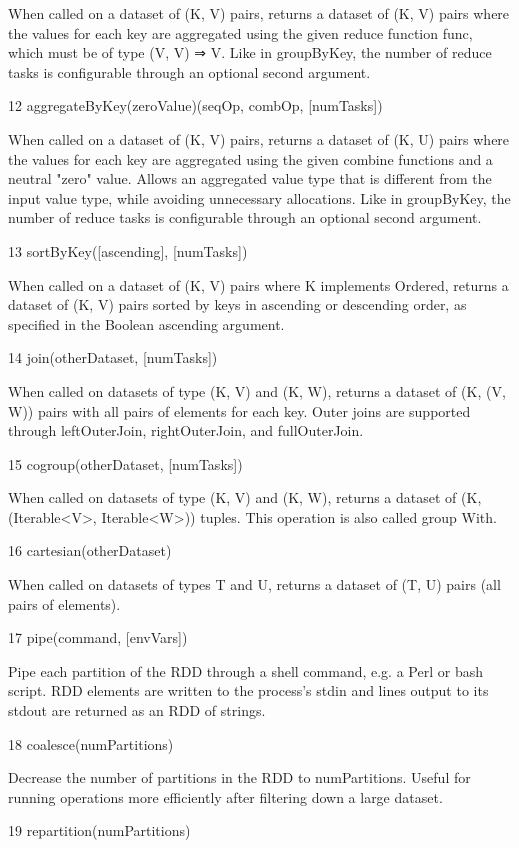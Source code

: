 When called on a dataset of (K, V) pairs, returns a dataset of (K, V) pairs where the values for each key are aggregated using the given reduce function func, which must be of type (V, V) ⇒ V. Like in groupByKey, the number of reduce tasks is configurable through an optional second argument.

12	
aggregateByKey(zeroValue)(seqOp, combOp, [numTasks])

When called on a dataset of (K, V) pairs, returns a dataset of (K, U) pairs where the values for each key are aggregated using the given combine functions and a neutral "zero" value. Allows an aggregated value type that is different from the input value type, while avoiding unnecessary allocations. Like in groupByKey, the number of reduce tasks is configurable through an optional second argument.

13	
sortByKey([ascending], [numTasks])

When called on a dataset of (K, V) pairs where K implements Ordered, returns a dataset of (K, V) pairs sorted by keys in ascending or descending order, as specified in the Boolean ascending argument.

14	
join(otherDataset, [numTasks])

When called on datasets of type (K, V) and (K, W), returns a dataset of (K, (V, W)) pairs with all pairs of elements for each key. Outer joins are supported through leftOuterJoin, rightOuterJoin, and fullOuterJoin.

15	
cogroup(otherDataset, [numTasks])

When called on datasets of type (K, V) and (K, W), returns a dataset of (K, (Iterable<V>, Iterable<W>)) tuples. This operation is also called group With.

16	
cartesian(otherDataset)

When called on datasets of types T and U, returns a dataset of (T, U) pairs (all pairs of elements).

17	
pipe(command, [envVars])

Pipe each partition of the RDD through a shell command, e.g. a Perl or bash script. RDD elements are written to the process's stdin and lines output to its stdout are returned as an RDD of strings.

18	
coalesce(numPartitions)

Decrease the number of partitions in the RDD to numPartitions. Useful for running operations more efficiently after filtering down a large dataset.

19	
repartition(numPartitions)

